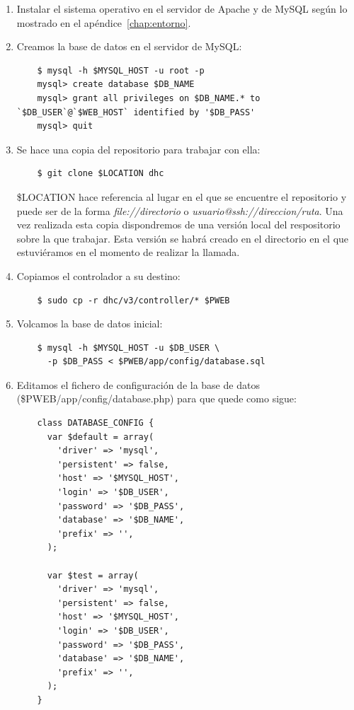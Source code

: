 \begin{enumerate}
	\item Instalar el sistema operativo en el servidor de Apache y de MySQL según lo mostrado en el apéndice~\ref{chap:entorno}.
	
	\item Creamos la base de datos en el servidor de MySQL:
	
	\begin{verbatim}
	$ mysql -h $MYSQL_HOST -u root -p
	mysql> create database $DB_NAME
	mysql> grant all privileges on $DB_NAME.* to `$DB_USER`@`$WEB_HOST` identified by '$DB_PASS'
	mysql> quit
	\end{verbatim}

	\item Se hace una copia del repositorio para trabajar con ella:
	
	\begin{verbatim}
	$ git clone $LOCATION dhc
	\end{verbatim}
	
	\$LOCATION hace referencia al lugar en el que se encuentre el repositorio y puede ser de la forma \emph{file://directorio} o \emph{usuario@ssh://direccion/ruta}. Una vez realizada esta copia dispondremos de una versión local del respositorio sobre la que trabajar. Esta versión se habrá creado en el directorio en el que estuviéramos en el momento de realizar la llamada.

	\item Copiamos el controlador a su destino:
	
	\begin{verbatim}
	$ sudo cp -r dhc/v3/controller/* $PWEB
	\end{verbatim}
	
	\item Volcamos la base de datos inicial:
	
	\begin{verbatim}
	$ mysql -h $MYSQL_HOST -u $DB_USER \
	  -p $DB_PASS < $PWEB/app/config/database.sql
	\end{verbatim}
	
	\item Editamos el fichero de configuración de la base de datos (\$PWEB/app/config/database.php) para que quede como sigue:
	
	\begin{verbatim}
	class DATABASE_CONFIG {
	  var $default = array(
	    'driver' => 'mysql',
	    'persistent' => false,
	    'host' => '$MYSQL_HOST',
	    'login' => '$DB_USER',
	    'password' => '$DB_PASS',
	    'database' => '$DB_NAME',
	    'prefix' => '',
	  );

	  var $test = array(
	    'driver' => 'mysql',
	    'persistent' => false,
	    'host' => '$MYSQL_HOST',
	    'login' => '$DB_USER',
	    'password' => '$DB_PASS',
	    'database' => '$DB_NAME',
	    'prefix' => '',
	  );
	}
	\end{verbatim}
\end{enumerate}	

